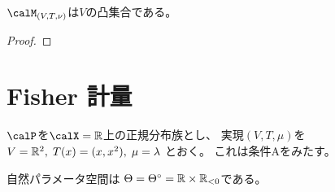\documentclass[report]{jlreq}
\begin{document}
\begin{proposition}
    $\calM_{(V, T, \nu)}$は$V$の凸集合である。
\end{proposition}

\begin{proof}
    \TODO{}
\end{proof}


%
\section{Fisher 計量}

\begin{example}[正規分布族]
    $\calP$を$\calX = \R$上の正規分布族とし、
    実現$(V, T, \mu)$を
    $V = \mathbb{R}^2, \;
        T(x) = (x, x^2), \;
        \mu = \lambda$
    とおく。
    これは条件Aをみたす。

    自然パラメータ空間は
    $\Theta = \Theta^\circ = \mathbb{R} \times \mathbb{R}_{< 0}$である。


\end{example}
\end{document}
